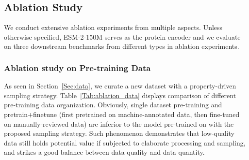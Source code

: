 \subsection{Ablation Study}
\label{Sec:ablation}
We conduct extensive ablation experiments from multiple aspects. Unless otherwise specified, ESM-2-150M serves as the protein encoder and we evaluate on three downstream benchmarks from different types in ablation experiments.

\subsubsection{Ablation study on Pre-training Data}
As seen in Section~\ref{Sec:data}, we curate a new dataset \ourdataset with a property-driven sampling strategy. Table~\ref{Tab:ablation_data} displays comparison of different pre-training data organization. 
Obviously, single dataset pre-training and pretrain+finetune (first pretrained on machine-annotated data, then fine-tuned on manually-reviewed data) are inferior to the model pre-trained on \ourdatasetD with the proposed sampling strategy. Such phenomenon demonstrates that low-quality data still holds potential value if subjected to elaborate processing and sampling, and \ourdataset strikes a good balance between data quality and data quantity.

